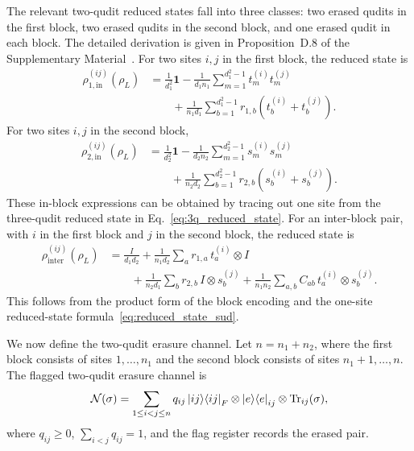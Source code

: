 \documentclass[10pt,twocolumn,superscriptaddress,aps,amsmath,amssymb,citeautoscript,floatfix,prx,longbibliography]{revtex4-2}
\theoremstyle{plain}
\theoremstyle{plain}
\theoremstyle{plain}
\theoremstyle{plain}
\theoremstyle{plain}
\theoremstyle{plain}
\begin{document}
The relevant two-qudit reduced states fall into three classes: two erased qudits in the first block, two erased qudits in the second block, and one erased qudit in each block. The detailed derivation is given in Proposition~D.8 of the Supplementary Material~\cite{SuppMat}. For two sites $i,j$ in the first block, the reduced state is
$$
\begin{aligned}
    \rho_{1,\mathrm{in}}^{(ij)}(\rho_L)
    &=
    \frac{1}{d_1^2}\mathbf 1
    -
    \frac{1}{d_1n_1}
    \sum_{m=1}^{d_1^2-1}
    t_m^{(i)}t_m^{(j)}
    \\
    &\qquad
    +
    \frac{1}{n_1d_1}
    \sum_{b=1}^{d_1^2-1}
    r_{1,b}
    \left(
        t_b^{(i)}
        +
        t_b^{(j)}
    \right).
\end{aligned}
$$
For two sites $i,j$ in the second block,
$$
\begin{aligned}
    \rho_{2,\mathrm{in}}^{(ij)}(\rho_L)
    &=
    \frac{1}{d_2^2}\mathbf 1
    -
    \frac{1}{d_2n_2}
    \sum_{m=1}^{d_2^2-1}
    s_m^{(i)}s_m^{(j)}
    \\
    &\qquad
    +
    \frac{1}{n_2d_2}
    \sum_{b=1}^{d_2^2-1}
    r_{2,b}
    \left(
        s_b^{(i)}
        +
        s_b^{(j)}
    \right).
\end{aligned}
$$
These in-block expressions can be obtained by tracing out one site from the three-qudit reduced state in Eq.~\eqref{eq:3q_reduced_state}. For an inter-block pair, with $i$ in the first block and $j$ in the second block, the reduced state is
$$
\begin{aligned}
    \rho_{\mathrm{inter}}^{(ij)}(\rho_L)
    &=
    \frac{I}{d_1d_2}
    +
    \frac{1}{n_1d_2}
    \sum_a r_{1,a}\,t_a^{(i)}\otimes I
    \\
    &\qquad
    +
    \frac{1}{n_2d_1}
    \sum_b r_{2,b}\,I\otimes s_b^{(j)}
    +
    \frac{1}{n_1n_2}
    \sum_{a,b}
    C_{ab}\,t_a^{(i)}\otimes s_b^{(j)} .
\end{aligned}
$$
This follows from the product form of the block encoding and the one-site reduced-state formula~\eqref{eq:reduced_state_sud}.

We now define the two-qudit erasure channel. Let $n=n_1+n_2$, where the first block consists of sites $1,\ldots,n_1$ and the second block consists of sites $n_1+1,\ldots,n$. The flagged two-qudit erasure channel is
$$
    \mathcal N(\sigma)
    =
    \sum_{1\le i<j\le n}
    q_{ij}
    \ket{ij}\!\bra{ij}_F
    \otimes
    \ket e\!\bra e_{ij}
    \otimes
    \operatorname{Tr}_{ij}(\sigma),
$$
where $q_{ij}\ge 0$, $\sum_{i<j}q_{ij}=1$, and the flag register records the erased pair.
\end{document}
